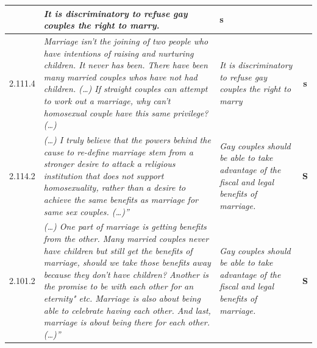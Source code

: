 \begin{table}[t!]
{\begin{tabular}{@{}lp{9.5cm}p{3.5cm}c@{}}
& \normalsize{%
\textit{ It is discriminatory to refuse gay couples the right to marry.}
}
& \textbf{s} \\
\midrule
2.111.4 & \normalsize{%
\textit{
Marriage isn't the joining of two people who have intentions of raising
and nurturing children. It never has been. There have been many married couples
whos have not had children. (\dots) If straight couples can attempt to work out a
marriage, why can't homosexual couple have this same privilege? (\dots)
}} 
& \normalsize{%
\textit{
It is discriminatory to refuse gay couples the right to marry
}
}
& \textbf{s} \\
\midrule
2.114.2 & \normalsize{%
\textit{
(\dots) I truly believe that the powers
behind the cause to re-define marriage stem from a stronger desire to attack a
religious institution that does not support homosexuality, rather than a desire
to achieve the same benefits as marriage for same sex couples. (\dots)''} 
}
& \normalsize{%
\textit{
Gay couples should be able to take advantage of the fiscal and legal benefits
of marriage.} 
}
& \textbf{S} \\
\midrule
2.101.2
&
\normalsize{%
\textit{
(\dots) One part of marriage is getting benefits from the other. Many married
couples never have children but still get the benefits of marriage, should we
take those benefits away because they don't have children? Another is the
promise to be with each other for an eternity" etc. Marriage is also about
being able to celebrate having each other. And last, marriage is about being
there for each other. (\dots)''
}
}
&
\normalsize{%
\textit{
Gay couples should be able to take advantage of the fiscal and legal benefits
of marriage.
}
}
& \textbf{S} \\

\end{tabular}}
\end{table}
